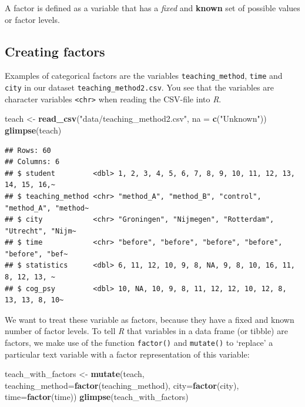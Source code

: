 \documentclass[
]{scrartcl}
\makeatletter
\newenvironment{Shaded}{\begin{snugshade}}{\end{snugshade}}
\newcommand{\AttributeTok}[1]{\textcolor[rgb]{0.13,0.29,0.53}{#1}}
\newcommand{\FunctionTok}[1]{\textcolor[rgb]{0.13,0.29,0.53}{\textbf{#1}}}
\newcommand{\NormalTok}[1]{#1}
\newcommand{\OtherTok}[1]{\textcolor[rgb]{0.56,0.35,0.01}{#1}}
\newcommand{\StringTok}[1]{\textcolor[rgb]{0.31,0.60,0.02}{#1}}
\newenvironment{kframe}{%
\medskip{}
\setlength{\fboxsep}{.8em}
 \def\at@end@of@kframe{}%
 \ifinner\ifhmode%
  \def\at@end@of@kframe{\end{minipage}}%
  \begin{minipage}{\columnwidth}%
 \fi\fi%
 \def\FrameCommand##1{\hskip\@totalleftmargin \hskip-\fboxsep
 \colorbox{shadecolor}{##1}\hskip-\fboxsep
     \hskip-\linewidth \hskip-\@totalleftmargin \hskip\columnwidth}%
 \MakeFramed {\advance\hsize-\width
   \@totalleftmargin\z@ \linewidth\hsize
   \@setminipage}}%
 {\par\unskip\endMakeFramed%
 \at@end@of@kframe}
\newenvironment{rmdblock}[1]
  {
  \begin{itemize}
  \renewcommand{\labelitemi}{
    \raisebox{-.7\height}[0pt][0pt]{
      {\setkeys{Gin}{width=3em,keepaspectratio}\texttt{[image: images/\#1]}}
    }
  }
  \setlength{\fboxsep}{1em}
  \begin{kframe}
  \item
  }
  {
  \end{kframe}
  \end{itemize}
  }
\newenvironment{important}
    {\begin{rmdblock}{hint}}
    {\end{rmdblock}}
\makeatother
\begin{document}
\begin{important}
A factor is defined as a variable that has a \emph{\emph{fixed}} and
\textbf{known} set of possible values or factor levels.
\end{important}

\hypertarget{creating-factors}{%
\subsection{Creating factors}\label{creating-factors}}

Examples of categorical factors are the variables \texttt{teaching\_method}, \texttt{time} and \texttt{city} in our dataset \texttt{teaching\_method2.csv}. You see that the variables are character variables \texttt{\textless{}chr\textgreater{}} when reading the CSV-file into \emph{R}.

\begin{Shaded}
\begin{Highlighting}[]
\NormalTok{teach }\OtherTok{\textless{}{-}} \FunctionTok{read\_csv}\NormalTok{(}\StringTok{"data/teaching\_method2.csv"}\NormalTok{, }\AttributeTok{na =} \FunctionTok{c}\NormalTok{(}\StringTok{"Unknown"}\NormalTok{))}
\FunctionTok{glimpse}\NormalTok{(teach)}
\end{Highlighting}
\end{Shaded}

\begin{verbatim}
## Rows: 60
## Columns: 6
## $ student         <dbl> 1, 2, 3, 4, 5, 6, 7, 8, 9, 10, 11, 12, 13, 14, 15, 16,~
## $ teaching_method <chr> "method_A", "method_B", "control", "method_A", "method~
## $ city            <chr> "Groningen", "Nijmegen", "Rotterdam", "Utrecht", "Nijm~
## $ time            <chr> "before", "before", "before", "before", "before", "bef~
## $ statistics      <dbl> 6, 11, 12, 10, 9, 8, NA, 9, 8, 10, 16, 11, 8, 12, 13, ~
## $ cog_psy         <dbl> 10, NA, 10, 9, 8, 11, 12, 12, 10, 12, 8, 13, 13, 8, 10~
\end{verbatim}

We want to treat these variable as factors, because they have a fixed and known number of factor levels. To tell \emph{R} that variables in a data frame (or tibble) are factors, we make use of the function \texttt{factor()} and \texttt{mutate()} to `replace' a particular text variable with a factor representation of this variable:

\begin{Shaded}
\begin{Highlighting}[]
\NormalTok{teach\_with\_factors }\OtherTok{\textless{}{-}} \FunctionTok{mutate}\NormalTok{(teach,}
                       \AttributeTok{teaching\_method=}\FunctionTok{factor}\NormalTok{(teaching\_method),}
                       \AttributeTok{city=}\FunctionTok{factor}\NormalTok{(city),}
                       \AttributeTok{time=}\FunctionTok{factor}\NormalTok{(time))}
\FunctionTok{glimpse}\NormalTok{(teach\_with\_factors)}
\end{Highlighting}
\end{Shaded}
\end{document}
